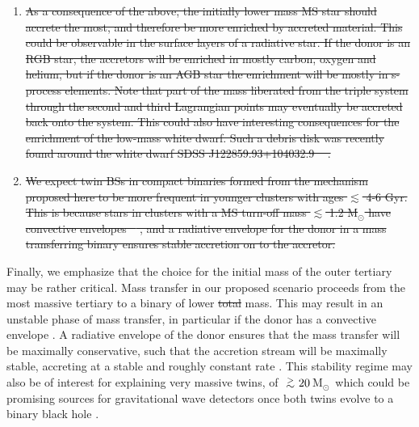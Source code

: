 \documentclass[twocolumn]{aastex62}
\newcommand{\MSun}{\mbox{M$_\odot$}}
\def\apgt{\ {\raise-.5ex\hbox{$\buildrel>\over\sim$}}\ }
\providecommand{\DIFdel}[1]{{\protect\color{red}\sout{#1}}}                      %
\providecommand{\DIFdelbegin}{} %
\providecommand{\DIFdelend}{} %
\begin{document}
\begin{enumerate}
\DIFdelbegin %
\item%
\DIFdel{As a consequence of the above, the initially lower mass MS star
  should accrete the most, and therefore be more enriched by accreted
  material.  This could be observable in the surface layers of a
  radiative star.  If the donor is an RGB star, the accretors will be
  enriched in mostly carbon, oxygen and helium, but if the donor is an
  AGB star the enrichment will be mostly in s-process elements.
  Note that part of the mass liberated from the triple system
    through the second and third Lagrangian points may eventually be
    accreted back onto the system.  This could also have interesting
    consequences for the enrichment of the low-mass white dwarf.  Such
    a debris disk was recently found around the white dwarf SDSS
    J122859.93+104032.9 \mbox{%
\citep{Manseretal2019}}%
.  
}%

\item%
\DIFdel{We expect twin BSs in compact binaries formed from the mechanism
  proposed here to be more frequent in younger clusters with ages
  $\lesssim$ 4-6 Gyr.  This is because stars in clusters with a MS turn-off
  mass $\lesssim$ 1.2 M$_{\odot}$ have convective envelopes
  \mbox{%
\citep[e.g.][]{1991ApJS...76...55I,2009pfer.book.....M}}%
, and a
  radiative envelope for the donor in a mass transferring binary
  ensures stable accretion on to the accretor.  
}%

\DIFdelend  \end{enumerate} 

Finally, we emphasize that the choice for the initial mass of the
outer tertiary may be rather critical.  Mass transfer in our proposed
scenario proceeds from the most massive tertiary to a binary of lower
\DIFdelbegin \DIFdel{total }\DIFdelend mass. This may result in an unstable phase of mass transfer, in
particular if the donor has a convective envelope
\citep[e.g.][]{2009pfer.book.....M}. A radiative envelope of the donor
ensures that the mass transfer will be maximally conservative, such
that the accretion stream will be maximally stable, accreting at a
stable and roughly constant rate \citep[e.g.][]{1991ApJS...76...55I}.
This stability regime may also be of interest for explaining very
massive twins, of $\apgt 20$\,\MSun\, which could be promising sources
for gravitational wave detectors once both twins evolve to a binary
black hole \citep{2016MNRAS.460.3545D}.
\end{document}
